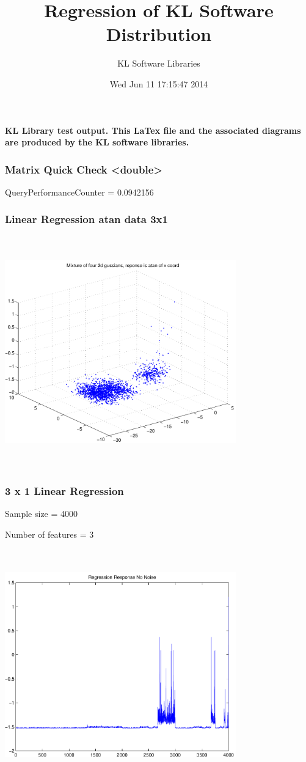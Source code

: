 \documentclass[9pt]{article}
\theoremstyle{plain}
\theoremstyle{definition}
\theoremstyle{remark}
\numberwithin{equation}{section}
\begin{document}
\title{Regression of KL Software Distribution   }
\author{KL Software Libraries}
\date{Wed Jun 11 17:15:47 2014
}
\maketitle
\textbf{ KL Library test output.  This LaTex file and the associated diagrams are produced by the KL software libraries.}
\subsubsection{Matrix Quick Check <double>}
QueryPerformanceCounter  =  0.0942156
\subsubsection{Linear Regression atan data 3x1}
\includegraphics[width=10.0cm,height=10.0cm]{AtanDataSet.pdf}

\subsubsection{3 x 1 Linear Regression}
Sample size = 4000

Number of features = 3

\includegraphics[width=10.0cm,height=10.0cm]{AtanDataSet_regression_response_no_noise.pdf}
\end{document}
